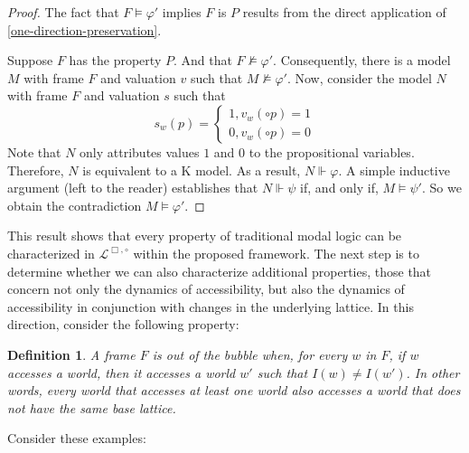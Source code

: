 \documentclass{amsart}
\newtheorem{definition}{Definition}[section]
\begin{document}
\begin{proof}
   The fact that $F \vDash \varphi'$ implies $F$ is $P$ results from the direct application of \cref{one-direction-preservation}. 

   Suppose $F$ has the property $P$. And that $F \nvDash \varphi'$. Consequently, there is a model $M$ with frame $F$ and valuation $v$ such that $M \nvDash \varphi'$. Now, consider the model $N$ with frame $F$ and valuation $s$ such that
   $$s_w(p) = \begin{cases}
       1, v_w(\circ p) = 1\\
       0, v_w(\circ p) = 0
   \end{cases}$$
   Note that $N$ only attributes values $1$ and $0$ to the propositional variables. Therefore, $N$ is equivalent to a K model. As a result, $N \Vdash \varphi$. A simple inductive argument (left to the reader) establishes that $N \Vdash \psi$ if, and only if, $M \vDash \psi'$. So we obtain the contradiction $M \vDash \varphi'$.

\end{proof}

This result shows that every property of traditional modal logic can be characterized in $\mathcal{L}^{\Box,\circ}$ within the proposed framework. The next step is to determine whether we can also characterize additional properties, those that concern not only the dynamics of accessibility, but also the dynamics of accessibility in conjunction with changes in the underlying lattice. In this direction, consider the following property:


\begin{definition}
    A frame $F$ is out of the bubble when, for every $w$ in $F$, if $w$ accesses a world, then it accesses a world $w'$ such that $I(w) \neq I(w')$. In other words, every world that accesses at least one world also accesses a world that does not have the same base lattice.
\end{definition}

Consider these examples:
\end{document}
